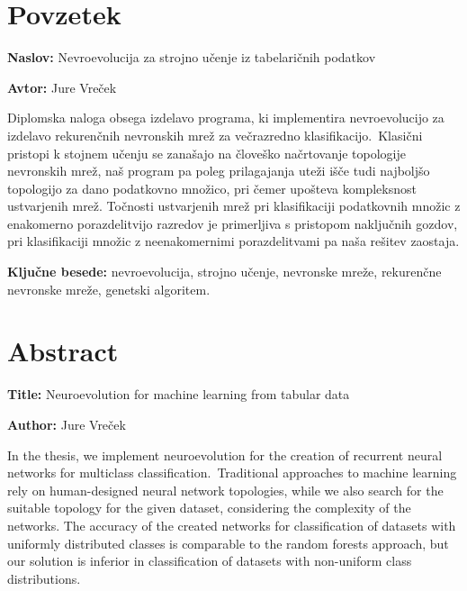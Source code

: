 \documentclass[a4paper,12pt,openright]{book}
\newcommand{\ttitle}{Nevroevolucija za strojno učenje iz tabelaričnih podatkov}
\newcommand{\ttitleEn}{Neuroevolution for machine learning from tabular data}
\newcommand{\tauthor}{Jure Vreček}
\newcommand{\tkeywords}{nevroevolucija, strojno učenje, nevronske mreže, rekurenčne nevronske mreže, genetski algoritem}
\newcommand{\clearemptydoublepage}{\newpage{\pagestyle{empty}\cleardoublepage}}
\begin{document}
    \chapter*{Povzetek}

    \noindent\textbf{Naslov:} \ttitle
    \bigskip

    \noindent\textbf{Avtor:} \tauthor
    \bigskip

    \noindent
    Diplomska naloga obsega izdelavo programa, ki implementira nevroevolucijo za izdelavo rekurenčnih nevronskih mrež za večrazredno
    klasifikacijo.\ Klasični pristopi k stojnem učenju se zanašajo na človeško načrtovanje topologije nevronskih mrež, naš
    program pa poleg prilagajanja uteži išče tudi najboljšo topologijo za dano podatkovno množico, pri čemer upošteva
    kompleksnost ustvarjenih mrež.
    Točnosti ustvarjenih mrež pri klasifikaciji podatkovnih množic z enakomerno porazdelitvijo razredov je primerljiva
    s pristopom naključnih gozdov, pri klasifikaciji množic z neenakomernimi porazdelitvami pa naša rešitev zaostaja.

    \bigskip

    \noindent\textbf{Ključne besede:} \tkeywords.
    \clearemptydoublepage

    \chapter*{Abstract}

    \noindent\textbf{Title:} \ttitleEn
    \bigskip

    \noindent\textbf{Author:} \tauthor
    \bigskip

    \noindent
    In the thesis, we implement neuroevolution for the creation of recurrent neural networks
    for multiclass classification.\ Traditional approaches to machine learning rely on human-designed neural network
    topologies, while we also search for the suitable topology for the given dataset, considering
    the complexity of the networks.
    The accuracy of the created networks for classification of datasets with uniformly
    distributed classes is comparable to the random forests approach, but our solution is inferior in classification of
    datasets with non-uniform class distributions.
    \bigskip
\end{document}
